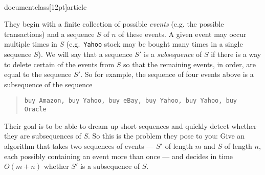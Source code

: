 \\documentclass[12pt]{article}
\begin{document}
\begin{enumerate}
They begin with a finite collection of possible
{\em events} (e.g. the possible transactions)
and a sequence $S$ of $n$ of these events.
A given event may occur multiple times in $S$
(e.g.~{\tt Yahoo} stock may be bought many times in a single sequence $S$).
We will say that a sequence $S'$ is a {\em subsequence}
of $S$ if there is a way to delete certain of the events
from $S$ so that the remaining events, in order, are equal to
the sequence $S'$.
So for example, the sequence of four events above is
a subsequence of the sequence
\begin{quote}
{\tt buy Amazon, buy Yahoo, buy eBay,
buy Yahoo, buy Yahoo, buy Oracle}
\end{quote}

Their goal is to be able to dream up short sequences
and quickly detect whether they are subsequences of $S$.
So this is the problem they pose to you:
Give an algorithm that takes
two sequences of events ---  $S'$ of length $m$ and $S$ of
length $n$, each possibly containing an event more than once ---
and decides in time $O(m + n)$ whether $S'$ is a subsequence of $S$.

\end{enumerate}
\end{document}

